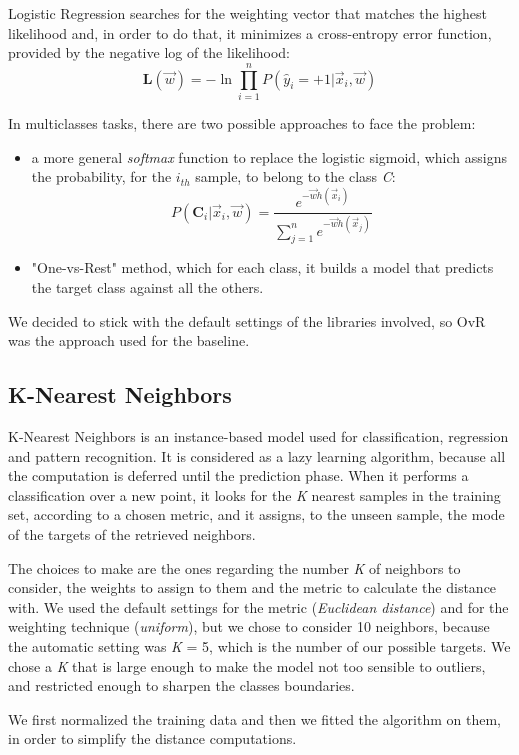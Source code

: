 Logistic Regression searches for the weighting vector that matches the highest likelihood and, in order to do that, it minimizes a cross-entropy
error function, provided by the negative log of the likelihood:
\[{ \mathbf{L}(\vec{w}) = -\ln \prod\limits_{i=1}^{n} P(\hat{y}_{i} = +1 | \vec{x}_{i}, \vec{w})}\]

In multiclasses tasks, there are two possible approaches to face the problem:
\begin{itemize}
	\item[\PencilRight] a more general \textit{softmax} function to replace the logistic sigmoid, which assigns the probability, for the  \textit{$i_{th}$} sample, to belong to the class \textit{C}:
	\[{\displaystyle P(\mathbf{C}_{i} | \vec{x}_{i}, \vec{w})={\frac {e^{-\vec{w}h(\vec{x}_{i})}}{\sum\limits_{j = 1}^{n}e^{-\vec{w}h(\vec{x}_{j})}}}}\]
	\item[\PencilRight] "One-vs-Rest" method, which for each class, it builds a model that predicts the target class against all the others.
\end{itemize}
We decided to stick with the default settings of the libraries involved, so OvR was the approach used for the baseline.

\subsection{K-Nearest Neighbors}
K-Nearest Neighbors is an instance-based model used for classification, regression and pattern recognition. It is considered as a lazy learning algorithm, because all the computation is deferred until the prediction phase.
When it performs a classification over a new point, it looks for the \textit{K} nearest samples in the training set, according to a chosen metric, and it assigns, to the unseen sample, the mode of the targets of the retrieved neighbors.

The choices to make are the ones regarding the number \textit{K} of neighbors to consider, the weights to assign to them and the metric to calculate the distance with.
We used the default settings for the metric (\textit{Euclidean distance}) and for the weighting technique (\textit{uniform}), but we chose to consider 10 neighbors, because the automatic setting was \textit{K} = 5, which is the number of our possible targets.
We chose a \textit{K} that is large enough to make the model not too sensible to outliers, and restricted enough to sharpen the classes boundaries.

We first normalized the training data and then we fitted the algorithm on them, in order to simplify the distance computations.

